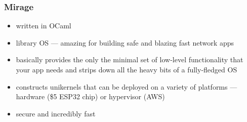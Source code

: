 \documentclass{beamer}
\begin{document}
\begin{frame}
	\frametitle{Mirage}

	\begin{itemize}
		\item written in OCaml
		\item library OS --- amazing for building safe and
		blazing fast network apps
		\item basically provides the only the minimal set of low-level
		functionality that your app needs and strips down all the
		heavy bits of a fully-fledged OS
		\item constructs unikernels that can be deployed on
		a variety of platforms --- hardware (\$5 ESP32 chip)
		or hypervisor (AWS)
		\item secure and incredibly fast
	\end{itemize}
\end{frame}


\begin{frame}

\end{frame}
\end{document}
